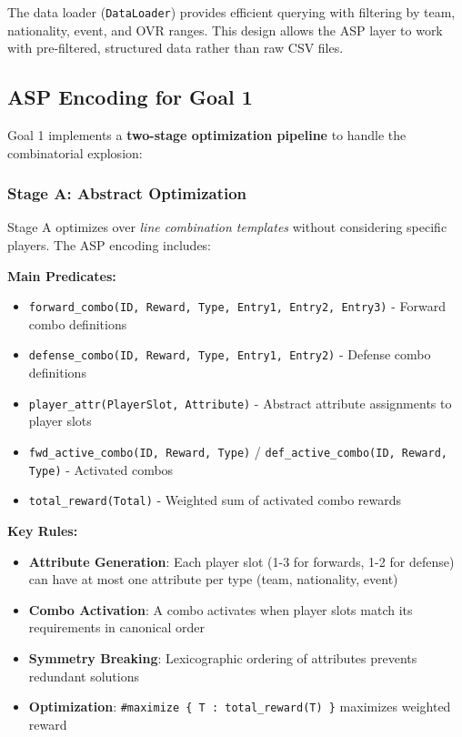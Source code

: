 The data loader (\texttt{DataLoader}) provides efficient querying with filtering by team, nationality, event, and OVR ranges. This design allows the ASP layer to work with pre-filtered, structured data rather than raw CSV files.

\subsection{ASP Encoding for Goal 1}

Goal 1 implements a \textbf{two-stage optimization pipeline} to handle the combinatorial explosion:

\subsubsection{Stage A: Abstract Optimization}

Stage A optimizes over \textit{line combination templates} without considering specific players. The ASP encoding includes:

\textbf{Main Predicates:}
\begin{itemize}
    \item \texttt{forward\_combo(ID, Reward, Type, Entry1, Entry2, Entry3)} - Forward combo definitions
    \item \texttt{defense\_combo(ID, Reward, Type, Entry1, Entry2)} - Defense combo definitions
    \item \texttt{player\_attr(PlayerSlot, Attribute)} - Abstract attribute assignments to player slots
    \item \texttt{fwd\_active\_combo(ID, Reward, Type)} / \texttt{def\_active\_combo(ID, Reward, Type)} - Activated combos
    \item \texttt{total\_reward(Total)} - Weighted sum of activated combo rewards
\end{itemize}

\textbf{Key Rules:}
\begin{itemize}
    \item \textbf{Attribute Generation}: Each player slot (1-3 for forwards, 1-2 for defense) can have at most one attribute per type (team, nationality, event)
    \item \textbf{Combo Activation}: A combo activates when player slots match its requirements in canonical order
    \item \textbf{Symmetry Breaking}: Lexicographic ordering of attributes prevents redundant solutions
    \item \textbf{Optimization}: \texttt{\#maximize \{ T : total\_reward(T) \}} maximizes weighted reward
\end{itemize}

